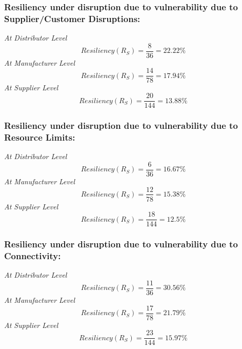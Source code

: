 \subsubsection{Resiliency under disruption due to vulnerability due to Supplier/Customer Disruptions:}

\textit{At Distributor Level}
\begin{equation}
    Resiliency(R_S) = \frac{8}{36} = 22.22 \% \label{3.5}
\end{equation}
\newline
\textit{At Manufacturer Level}
\begin{equation}
    Resiliency(R_S) = \frac{14}{78} = 17.94 \% \label{3.6}
\end{equation}
\newline
\textit{At Supplier Level}
\begin{equation}
    Resiliency(R_S) = \frac{20}{144} = 13.88 \% \label{3.7}
\end{equation}

\subsubsection{Resiliency under disruption due to vulnerability due to Resource Limits:}

\textit{At Distributor Level}
\begin{equation}
    Resiliency(R_S) = \frac{6}{36} = 16.67 \% \label{3.8}
\end{equation}
\newline
\textit{At Manufacturer Level}
\begin{equation}
    Resiliency(R_S) = \frac{12}{78} = 15.38 \% \label{3.9}
\end{equation}
\newline
\textit{At Supplier Level}
\begin{equation}
    Resiliency(R_S) = \frac{18}{144} = 12.5 \% \label{3.10}
\end{equation}

\subsubsection{Resiliency under disruption due to vulnerability due to Connectivity:}

\textit{At Distributor Level}
\begin{equation}
    Resiliency(R_S) = \frac{11}{36} = 30.56 \% \label{3.11}
\end{equation}
\newline
\textit{At Manufacturer Level}
\begin{equation}
    Resiliency(R_S) = \frac{17}{78} = 21.79 \% \label{3.12}
\end{equation}
\newline
\textit{At Supplier Level}
\begin{equation}
    Resiliency(R_S) = \frac{23}{144} = 15.97 \% \label{3.13}
\end{equation}

